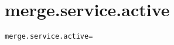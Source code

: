 \section{merge.service.active}
\label{configuration:MergeServiceActive}
\AvailableInCsharpOnly{\TODO}
\begin{lstlisting}[style=Props,caption={Usage example for \textit{merge.service.active}}]
merge.service.active=
\end{lstlisting}